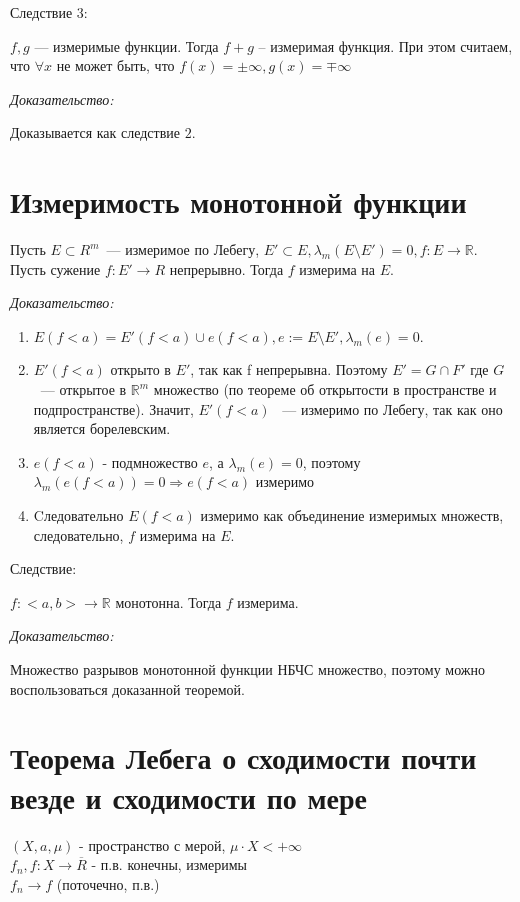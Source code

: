 \documentclass[paper=a4, fontsize=17pt]{article}
\begin{document}
Следствие $3$:

$f, g$ --- измеримые функции. Тогда $f + g$ -- измеримая функция. При этом считаем, что $\forall x$ не может быть, что $f(x) = \pm \infty, g(x) = \mp \infty$

\emph{Доказательство:}

Доказывается как следствие $2$.

\section{Измеримость монотонной функции}

Пусть $E \subset R^m$~--- измеримое по Лебегу, $E' \subset E, \lambda_m (E \setminus E') = 0, f: E \rightarrow \mathds{R}.$ Пусть сужение $f: E' \rightarrow R$ непрерывно. Тогда $f$ измерима на $E$.

\emph{Доказательство:}

\begin{enumerate}
	\item $E(f < a) = E'(f < a) \cup e(f < a), e:=E \setminus E', \lambda_m(e) = 0$.
	\item $ E'(f < a)$ открыто в $E'$, так как f непрерывна. Поэтому $E' = G \cap F'$ где $G$ ~--- открытое в $\mathds{R}^m$ множество (по теореме об открытости в пространстве и подпространстве).  Значит, $E'(f<a)$ ~--- измеримо по Лебегу, так как оно является борелевским.
	\item $e(f < a)$ - подмножество $e$, а $\lambda_m(e) = 0$, поэтому $\lambda_m(e(f < a)) = 0 \Rightarrow e(f < a)$ измеримо
	\item Cледовательно $E(f < a)$ измеримо как объединение измеримых множеств, следовательно, $f$ измерима на $E$.
\end{enumerate}

Следствие:

$f: <a, b> \rightarrow \mathds{R}$ монотонна. Тогда $f$ измерима.

\emph{Доказательство:}

Множество разрывов монотонной функции НБЧС множество, поэтому можно воспользоваться доказанной теоремой.

\section{Теорема Лебега о сходимости почти везде и сходимости по мере}

$(X, a, \mu)$ - пространство с мерой, $\mu \cdot X < +\infty$ \\
$f_n , f : X \rightarrow \overline R$ - п.в. конечны, измеримы \\
$f_n \rightarrow f$ (поточечно, п.в.)
\end{document}
